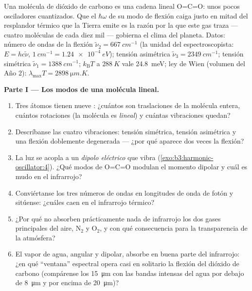 \begin{problem}\label{pb:b3:harmonic-oscillator:1}
Una molécula de dióxido de carbono es una cadena lineal O=C=O: unos pocos
osciladores cuantizados. Que el $\hbar\omega$ de su modo de flexión caiga
justo en mitad del resplandor térmico que la Tierra emite es la razón por la
que este gas traza --- cuatro moléculas de cada diez mil --- gobierna el
clima del planeta. Datos: número de ondas de la flexión $\tilde\nu_2 = \qty{667}{cm^{-1}}$
(la unidad del espectroscopista: $E = hc\tilde\nu$, $\qty{1}{cm^{-1}} =
\qty{1.24e-4}{eV}$); tensión asimétrica $\tilde\nu_3 =
\qty{2349}{cm^{-1}}$; tensión simétrica $\tilde\nu_1 =
\qty{1388}{cm^{-1}}$; $k_{\text{B}}T$ a $\qty{288}{K}$ vale
\qty{24.8}{meV}; ley de Wien (volumen del Año 2): $\lambda_{\max}T =
\qty{2898}{\micro m.K}$.

\medskip\noindent\textbf{Parte I --- Los modos de una molécula lineal.}
\begin{enumerate}
  \item Tres átomos tienen nueve : ¿cuántos son
        traslaciones de la molécula entera, cuántos rotaciones (la
        molécula es \emph{lineal}) y cuántas vibraciones quedan?
  \item Descríbanse las cuatro vibraciones: tensión simétrica, tensión
        asimétrica y una flexión doblemente degenerada --- ¿por qué
        aparece dos veces la flexión?
  \item La luz se acopla a un \emph{dipolo eléctrico} que vibra
        (\cref{exo:b3:harmonic-oscillator:4}). ¿Qué modos de
        O=C=O modulan el momento dipolar y cuál es mudo en el
        infrarrojo?
  \item Conviértanse los tres números de ondas en longitudes de onda de
        fotón y sitúense: ¿cuáles caen en el infrarrojo térmico?
  \item ¿Por qué no absorben prácticamente nada de infrarrojo los dos
        gases principales del aire, N$_2$ y O$_2$, y con qué consecuencia
        para la transparencia de la atmósfera?
  \item El vapor de agua, angular y dipolar, absorbe en buena parte del
        infrarrojo: ¿en qué ``ventana'' espectral opera casi en solitario
        la flexión del dióxido de carbono (compárense los \qty{15}{\micro m}
        con las bandas intensas del agua por debajo de \qty{8}{\micro m} y
        por encima de \qty{20}{\micro m})?
\end{enumerate}


\end{problem}
